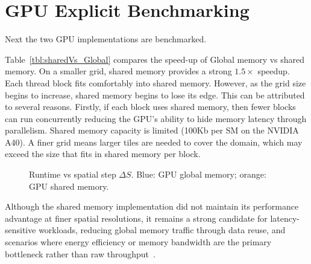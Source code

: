\documentclass[11pt]{report}
\begin{document}
\section{GPU Explicit Benchmarking}
Next the two GPU implementations are benchmarked.

\begin{table}[H]
\centering
{}
\caption{Computation time measured in milliseconds for the global-memory and shared-memory implementations.}\label{tbl:sharedVs_Global}
\end{table}

Table~\ref{tbl:sharedVs_Global} compares the speed-up of Global memory vs shared memory.
On a smaller grid, shared memory provides a strong $1.5 \times$ speedup.
Each thread block fits comfortably into shared memory. However, as the
grid size begins to increase, shared memory begins to lose its edge. 
This can be attributed to several reasons. Firstly, 
if each block uses shared memory, then fewer blocks can run 
concurrently reducing the GPU's ability to hide memory latency through parallelism.
Shared memory capacity is limited (100Kb per SM on the NVIDIA A40). 
A finer grid means larger tiles are needed to cover the domain, which may exceed the size that fits in shared memory per block.
\begin{figure}[H]
  \centering
  
  \caption{Runtime vs spatial step $\Delta S$. Blue: GPU global memory; orange: GPU shared memory.}
  \label{fig:spatial-time-gpu}
\end{figure}

Although the shared memory implementation did not maintain its performance advantage at 
finer spatial resolutions, it remains a strong candidate for
latency-sensitive workloads, reducing global memory traffic 
through data reuse, and scenarios where energy efficiency or 
memory bandwidth are the primary bottleneck rather than raw throughput~\cite{mei2016dissectinggpumemoryhierarchy}.
\end{document}
